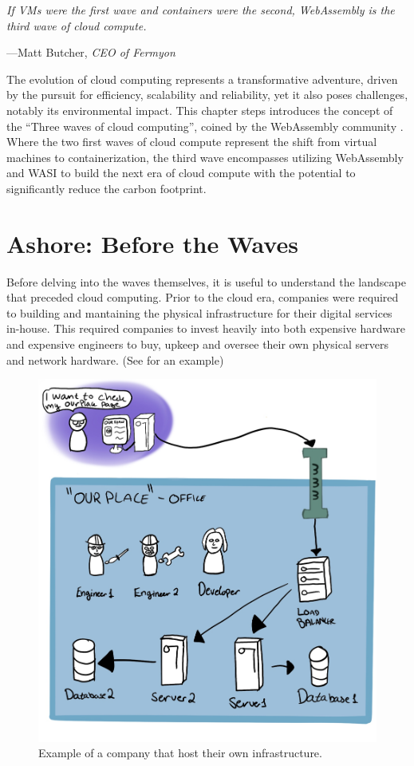 \documentclass[
  table]{report}
\begin{document}
\setlength{}

\epigraph{\itshape 
If VMs were the first wave and containers were the second, WebAssembly is the third wave of cloud compute.
}{---Matt Butcher, \textit{CEO of Fermyon}}

The evolution of cloud computing represents a transformative adventure,
driven by the pursuit for efficiency, scalability and reliability, yet
it also poses challenges, notably its environmental impact. This chapter
steps introduces the concept of the ``Three waves of cloud computing'',
coined by the WebAssembly community
\citep*{butcherDodds2024, leonardWebAssemblyHeraldsThird2024}. Where the
two first waves of cloud compute represent the shift from virtual
machines to containerization, the third wave encompasses utilizing
WebAssembly and \ac{WASI} to build the next era of cloud compute with
the potential to significantly reduce the carbon footprint.

\section{Ashore: Before the Waves}
\label{sect:ashore}

Before delving into the waves themselves, it is useful to understand the
landscape that preceded cloud computing. Prior to the cloud era,
companies were required to building and mantaining the physical
infrastructure for their digital services in-house. This required
companies to invest heavily into both expensive hardware and expensive
engineers to buy, upkeep and oversee their own physical servers and
network hardware. (See  for an example)

\begin{figure}[H]
\centering
  \includegraphics[width=0.7\columnwidth]{assets/pre-wave.jpg}
  \caption{Example of a company that host their own infrastructure.}
  \label{fig:myspeis}
\end{figure}
\end{document}
